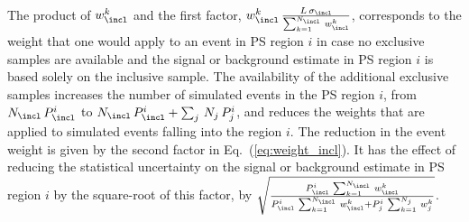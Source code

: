 The product of $w_{\incl}^{k}$ and the first factor, $w_{\incl}^{k} \, \frac{L \, \sigma_{\incl}}{\sum_{k=1}^{N_{\incl}} \, w_{\incl}^{k}}$,
corresponds to the weight that one would apply to an event in PS region $i$ 
in case no exclusive samples are available and the signal or background estimate in PS region $i$ is based solely on the inclusive sample.
The availability of the additional exclusive samples increases the number of simulated events in the PS region $i$, 
from $N_{\incl} \, P_{\incl}^{i}$ to $N_{\incl} \, P_{\incl}^{i} + \sum_{j} \, N_{j} \, P_{j}^{i}$,
and reduces the weights that are applied to simulated events falling into the region $i$.
The reduction in the event weight is given by the second factor in Eq.~(\ref{eq:weight_incl}).
It has the effect of reducing the statistical uncertainty on the signal or background estimate in PS region $i$
by the square-root of this factor,
\ie by $\sqrt{\frac{P_{\incl}^{i} \, \sum_{k=1}^{N_{\incl}} \, w_{\incl}^{k}}{P_{\incl}^{i} \, \sum_{k=1}^{N_{\incl}} \, w_{\incl}^{k} + P_{j}^{i} \, \sum_{k=1}^{N_{j}} \, w_{j}^{k}}}$.
